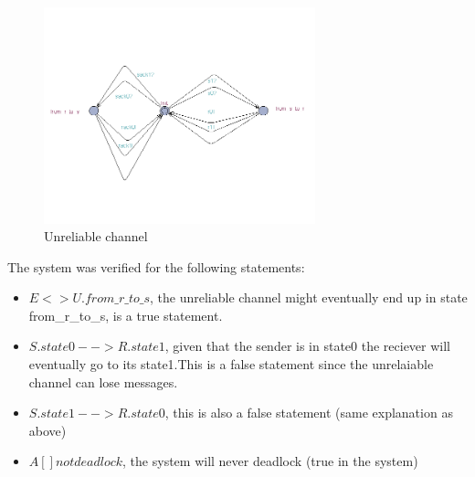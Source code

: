 \documentclass[12pt]{article}
\begin{document}
\begin{figure}[h!]
  \centering
  \includegraphics[width=0.7\textwidth]{unrel_chan.png}
  \caption{Unreliable channel}
  \label{fig:unrel_chan}
\end{figure}

The system was verified for the following statements:
\begin{itemize}
\item$ E<> U.from\_r\_to\_s$, the unreliable channel might eventually end up in state from\_r\_to\_s, is a true statement.
\item $S.state0-->R.state1$, given that the sender is in state0 the reciever will eventually go to its state1.This is a false statement since the unrelaiable channel can lose messages.
\item $S.state1-->R.state0$, this is also a false statement (same explanation as above)
\item $A[] not deadlock$, the system will never deadlock (true in the system)
\end{itemize}
\end{document}
